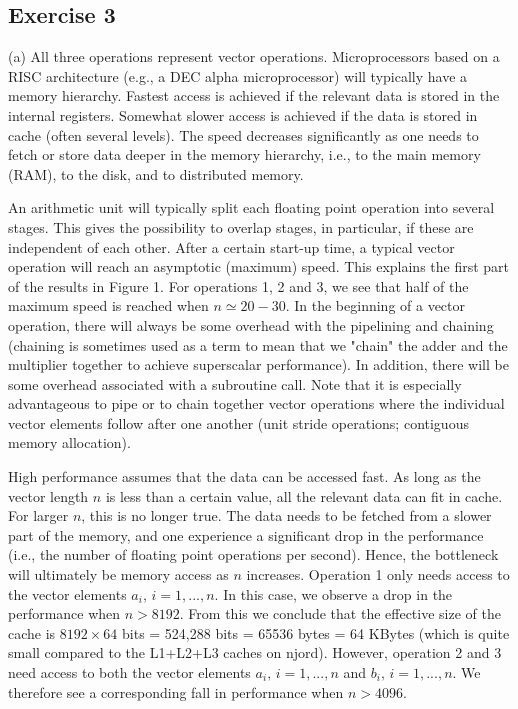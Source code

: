 \documentclass[11pt]{article}
\begin{document}
\subsection*{Exercise 3}

(a) All three operations represent vector operations.
Microprocessors based on a RISC architecture 
(e.g., a DEC alpha microprocessor) will typically have a 
memory hierarchy. Fastest access is achieved if the relevant data 
is stored in the internal registers. Somewhat slower access is 
achieved if the data is stored in cache (often several levels).
The speed decreases significantly as one needs to fetch or store 
data deeper in the memory hierarchy, i.e., to the main memory (RAM),
to the disk, and to distributed memory. 

An arithmetic unit will typically split each floating point operation 
into several stages. This gives the possibility to overlap stages,
in particular, if these are independent of each other. After a certain
start-up time,  a typical vector operation will reach an asymptotic 
(maximum) speed. This explains the first part of the results in 
Figure 1. For operations 1, 2 and 3, we see that half of the 
maximum speed is reached when $n \simeq 20-30$.
In the beginning of a vector operation, there will always be some
overhead with the pipelining and chaining (chaining is sometimes 
used as a term to mean that we "chain" the adder and the multiplier 
together to achieve superscalar performance). In addition, there will 
be some overhead associated with a subroutine call. 
Note that it is especially advantageous to pipe or to chain together 
vector operations where the individual vector elements 
follow after one another (unit stride operations; 
contiguous memory allocation).

High performance assumes that the data can be accessed fast.
As long as the vector length $n$ is less than a certain value, 
all the relevant data can fit in cache. For larger $n$, this 
is no longer true. The data needs to be fetched from a slower 
part of the memory, and one experience a significant drop in the
performance (i.e., the number of floating point operations per second).
Hence, the bottleneck will ultimately be memory access as $n$ increases. 
Operation 1 only needs access to the vector elements $a_i,\, i=1,...,n$. In this case, 
we observe a drop in the performance when $n > 8192$.
From this we conclude that the effective size of the cache
is $8192 \times 64$ bits = 524,288 bits = 65536 bytes =
64 KBytes (which is quite small compared to the L1+L2+L3 caches on njord).
However, operation 2 and 3 need access to both the 
vector elements $a_i,\, i=1,...,n$ and $b_i,\, i=1,...,n$. 
We therefore see a corresponding fall in performance when $n > 4096$. 
\end{document}
